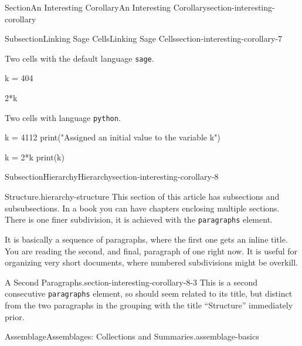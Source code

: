 \documentclass[twoside,10pt,]{article}
\newcommand{\mono}[1]{\texttt{#1}}
\numberwithin{equation}{section}
\begin{document}
\begin{sectionptx}{Section}{An Interesting Corollary}{}{An Interesting Corollary}{}{}{section-interesting-corollary}
\begin{subsectionptx}{Subsection}{Linking Sage Cells}{}{Linking Sage Cells}{}{}{section-interesting-corollary-7}
\par
Two cells with the default language \mono{sage}.%
\begin{sageinput}
k = 404
\end{sageinput}
\begin{sageinput}
2*k
\end{sageinput}
Two cells with language \mono{python}.%
\begin{sageinput}
k = 4112
print("Assigned an initial value to the variable k")
\end{sageinput}
\begin{sageinput}
k = 2*k
print(k)
\end{sageinput}
\end{subsectionptx}
%
%
\typeout{************************************************}
\typeout{************************************************}
%
\begin{subsectionptx}{Subsection}{Hierarchy}{}{Hierarchy}{}{}{section-interesting-corollary-8}
\begin{paragraphs}{Structure.}{hierarchy-structure}%
This section of this article has subsections and subsubsections.  In a book you can have chapters enclosing multiple sections.  There is one finer subdivision, it is achieved with the \mono{paragraphs} element.%
\par
It is basically a sequence of paragraphs, where the first one gets an inline title.  You are reading the second, and final, paragraph of one right now. It is useful for organizing very short documents, where numbered subdivisions might be overkill.%
\end{paragraphs}%
\begin{paragraphs}{A Second Paragraphs.}{section-interesting-corollary-8-3}%
This is a second consecutive \mono{paragraphs} element, so should seem related to its title, but distinct from the two paragraphs in the grouping with the title ``Structure'' immediately prior.%
\end{paragraphs}%
\begin{assemblage}{Assemblage}{Assemblages: Collections and Summaries.}{assemblage-basics}%

\end{assemblage}
\end{subsectionptx}
\end{sectionptx}
\end{document}
